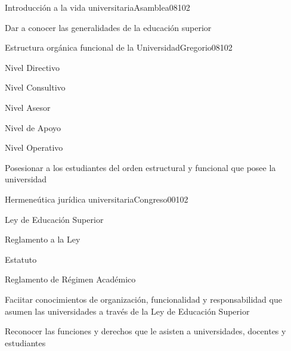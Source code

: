 \begin{syllabus}
\begin{unit}{Introducción a la vida universitaria}{Asamblea08}{10}{2}
   \begin{unitgoals}
      \item Dar a conocer las generalidades de la educación superior
   \end{unitgoals}
\end{unit}

\begin{unit}{Estructura orgánica funcional de la Universidad}{Gregorio08}{10}{2}
   \begin{topics}
        \item Nivel Directivo
	\item Nivel Consultivo
	\item Nivel Asesor
	\item Nivel de Apoyo
	\item Nivel Operativo
  \end{topics}

   \begin{unitgoals}
      \item Posesionar a los estudiantes del orden estructural y funcional que posee la universidad
   \end{unitgoals}
\end{unit}

\begin{unit}{Hermeneútica jurídica universitaria}{Congreso00}{10}{2}
   \begin{topics}
        \item Ley de Educación Superior 
	\item Reglamento a la Ley
	\item Estatuto
	\item Reglamento de Régimen Académico
   \end{topics}

   \begin{unitgoals}
      \item Faciitar conocimientos de organización, funcionalidad y responsabilidad que asumen las universidades a través de la Ley de Educación Superior
      \item Reconocer las funciones y derechos que le asisten a universidades, docentes y estudiantes
   \end{unitgoals}
\end{unit}

\begin{learning-strategies}
\FGLearningStrategies
\end{learning-strategies}

\begin{evaluation}
\FGEvaluation
\end{evaluation}


\end{syllabus}
